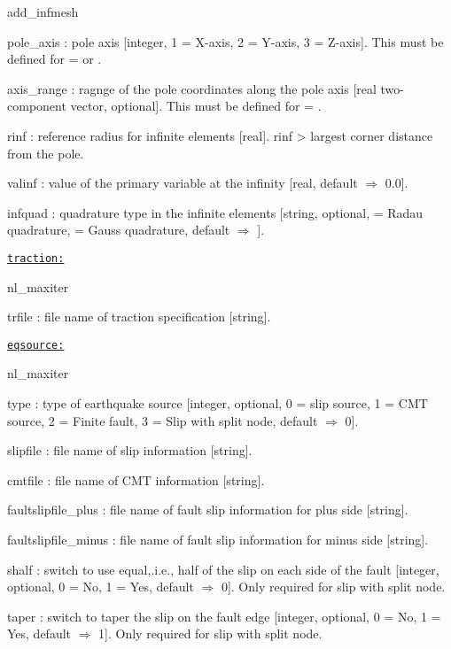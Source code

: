 \begin{adescription}{add\_infmesh}
  \item[pole\_axis]  : pole axis [integer, 1 = X-axis, 2 = Y-axis, 3 = Z-axis]. This must be defined for \texttt{} = \texttt{} or \texttt{}.
  \item[axis\_range]: ragnge of the pole coordinates along the pole axis [real two-component vector, optional]. This must be defined for \texttt{} = \texttt{}.
  \item[rinf]: reference radius for infinite elements [real]. rinf > largest corner distance from the pole.
  \item[valinf]: value of the primary variable at the infinity [real, default $\Rightarrow$ 0.0].
  \item[infquad]  : quadrature type in the infinite elements [string, optional, \texttt{} = Radau quadrature, \texttt{} = Gauss quadrature, default $\Rightarrow$ \texttt{}].
  \\
\end{adescription}

\texttt{\underline{traction:}}
\begin{adescription}{nl\_maxiter}
  \item[trfile]: file name of traction specification [string].
  \\
\end{adescription}

\texttt{\underline{eqsource:}}
\begin{adescription}{nl\_maxiter}
  \item[type]: type of earthquake source [integer, optional, 0 = slip source, 1 = CMT source, 2 = Finite fault, 3 = Slip with split node, default $\Rightarrow$ 0].
  \item[slipfile]: file name of slip information [string].
  \item[cmtfile]: file name of CMT information [string].
  \item[faultslipfile\_plus]: file name of fault slip information for plus side [string].
  \item[faultslipfile\_minus]: file name of fault slip information for minus side [string].
  \item[shalf]: switch to use equal,.i.e., half of the slip on each side of the fault [integer, optional, 0 = No, 1 = Yes, default $\Rightarrow$ 0]. Only required for slip with split node.
  \item[taper]: switch to taper the slip on the fault edge [integer, optional, 0 = No, 1 = Yes, default $\Rightarrow$ 1]. Only required for slip with split node.
  \\
\end{adescription}

